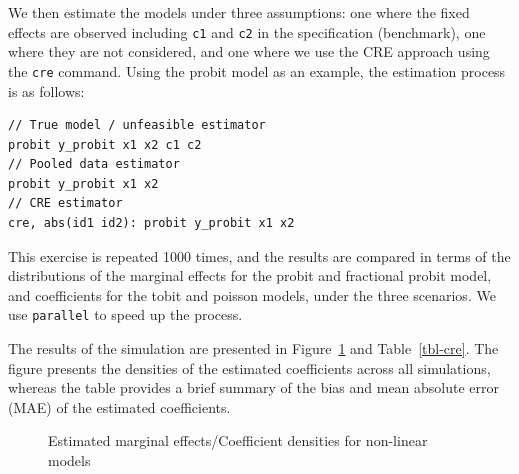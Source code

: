 \documentclass[bib]{statapress}
\begin{document}
We then estimate the models under three assumptions: one where the fixed
effects are observed including \texttt{c1} and \texttt{c2} in the
specification (benchmark), one where they are not considered, and one
where we use the CRE approach using the \texttt{cre} command. Using the
probit model as an example, the estimation process is as follows:

\begin{verbatim}
// True model / unfeasible estimator
probit y_probit x1 x2 c1 c2
// Pooled data estimator
probit y_probit x1 x2
// CRE estimator
cre, abs(id1 id2): probit y_probit x1 x2 
\end{verbatim}

This exercise is repeated 1000 times, and the results are compared in
terms of the distributions of the marginal effects for the probit and
fractional probit model, and coefficients for the tobit and poisson
models, under the three scenarios. We use
\texttt{parallel}\citep{vegayon2019} to speed up the process.

The results of the simulation are presented in Figure~\ref{fig-cre} and
Table~\ref{tbl-cre}. The figure presents the densities of the estimated
coefficients across all simulations, whereas the table provides a brief
summary of the bias and mean absolute error (MAE) of the estimated
coefficients.

\begin{figure}[H]


\caption{\label{fig-cre}Estimated marginal effects/Coefficient densities
for non-linear models}

\end{figure}%
\end{document}
